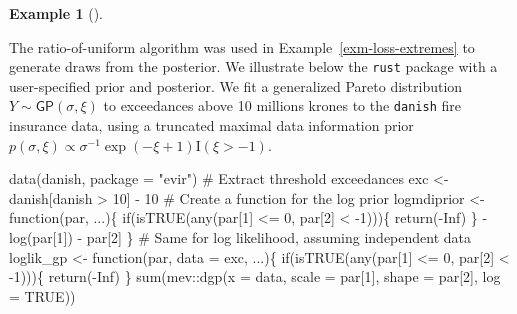 \documentclass[
  11pt,
  letterpaper,
]{scrbook}
\newenvironment{Shaded}{\begin{snugshade}}{\end{snugshade}}
\newcommand{\AttributeTok}[1]{\textcolor[rgb]{0.40,0.45,0.13}{#1}}
\newcommand{\CommentTok}[1]{\textcolor[rgb]{0.37,0.37,0.37}{#1}}
\newcommand{\ConstantTok}[1]{\textcolor[rgb]{0.56,0.35,0.01}{#1}}
\newcommand{\ControlFlowTok}[1]{\textcolor[rgb]{0.00,0.23,0.31}{#1}}
\newcommand{\DecValTok}[1]{\textcolor[rgb]{0.68,0.00,0.00}{#1}}
\newcommand{\FunctionTok}[1]{\textcolor[rgb]{0.28,0.35,0.67}{#1}}
\newcommand{\NormalTok}[1]{\textcolor[rgb]{0.00,0.23,0.31}{#1}}
\newcommand{\OtherTok}[1]{\textcolor[rgb]{0.00,0.23,0.31}{#1}}
\newcommand{\SpecialCharTok}[1]{\textcolor[rgb]{0.37,0.37,0.37}{#1}}
\newcommand{\StringTok}[1]{\textcolor[rgb]{0.13,0.47,0.30}{#1}}
\theoremstyle{definition}
\newtheorem{example}{Example}[chapter]
\theoremstyle{definition}
\theoremstyle{definition}
\theoremstyle{plain}
\theoremstyle{remark}
\begin{document}
\begin{example}[]\protect\hypertarget{exm-rust}{}\label{exm-rust}

The ratio-of-uniform algorithm was used in
Example~\ref{exm-loss-extremes} to generate draws from the posterior. We
illustrate below the \texttt{rust} package with a user-specified prior
and posterior. We fit a generalized Pareto distribution
\(Y \sim \mathsf{GP}(\sigma, \xi)\) to exceedances above 10 millions
krones to the \texttt{danish} fire insurance data, using a truncated
maximal data information prior
\(p(\sigma, \xi) \propto \sigma^{-1}\exp(-\xi+1)\mathrm{I}(\xi > -1)\).

\begin{Shaded}
\begin{Highlighting}[]
\FunctionTok{data}\NormalTok{(danish, }\AttributeTok{package =} \StringTok{"evir"}\NormalTok{)}
\CommentTok{\# Extract threshold exceedances}
\NormalTok{exc }\OtherTok{\textless{}{-}}\NormalTok{ danish[danish }\SpecialCharTok{\textgreater{}} \DecValTok{10}\NormalTok{] }\SpecialCharTok{{-}} \DecValTok{10}
\CommentTok{\# Create a function for the log prior}
\NormalTok{logmdiprior }\OtherTok{\textless{}{-}} \ControlFlowTok{function}\NormalTok{(par, ...)\{}
  \ControlFlowTok{if}\NormalTok{(}\FunctionTok{isTRUE}\NormalTok{(}\FunctionTok{any}\NormalTok{(par[}\DecValTok{1}\NormalTok{] }\SpecialCharTok{\textless{}=} \DecValTok{0}\NormalTok{, par[}\DecValTok{2}\NormalTok{] }\SpecialCharTok{\textless{}} \SpecialCharTok{{-}}\DecValTok{1}\NormalTok{)))\{}
    \FunctionTok{return}\NormalTok{(}\SpecialCharTok{{-}}\ConstantTok{Inf}\NormalTok{)}
\NormalTok{  \}}
  \SpecialCharTok{{-}}\FunctionTok{log}\NormalTok{(par[}\DecValTok{1}\NormalTok{]) }\SpecialCharTok{{-}}\NormalTok{ par[}\DecValTok{2}\NormalTok{]}
\NormalTok{\}}
\CommentTok{\# Same for log likelihood, assuming independent data}
\NormalTok{loglik\_gp }\OtherTok{\textless{}{-}} \ControlFlowTok{function}\NormalTok{(par, }\AttributeTok{data =}\NormalTok{ exc, ...)\{}
  \ControlFlowTok{if}\NormalTok{(}\FunctionTok{isTRUE}\NormalTok{(}\FunctionTok{any}\NormalTok{(par[}\DecValTok{1}\NormalTok{] }\SpecialCharTok{\textless{}=} \DecValTok{0}\NormalTok{, par[}\DecValTok{2}\NormalTok{] }\SpecialCharTok{\textless{}} \SpecialCharTok{{-}}\DecValTok{1}\NormalTok{)))\{}
    \FunctionTok{return}\NormalTok{(}\SpecialCharTok{{-}}\ConstantTok{Inf}\NormalTok{)}
\NormalTok{  \}}
  \FunctionTok{sum}\NormalTok{(mev}\SpecialCharTok{::}\FunctionTok{dgp}\NormalTok{(}\AttributeTok{x =}\NormalTok{ data, }\AttributeTok{scale =}\NormalTok{ par[}\DecValTok{1}\NormalTok{], }\AttributeTok{shape =}\NormalTok{ par[}\DecValTok{2}\NormalTok{], }\AttributeTok{log =} \ConstantTok{TRUE}\NormalTok{))}

\end{Highlighting}
\end{Shaded}
\end{example}
\end{document}
